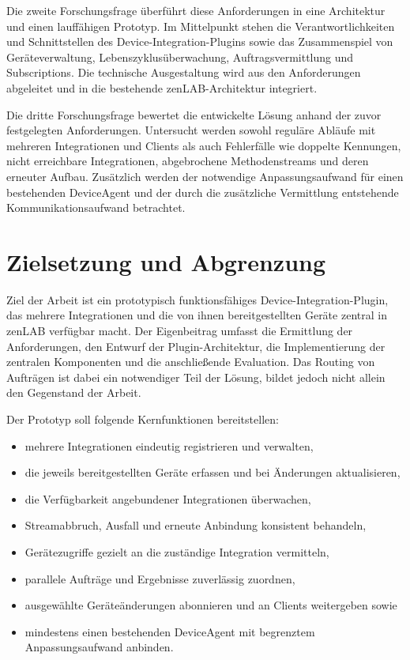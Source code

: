 Die zweite Forschungsfrage überführt diese Anforderungen in eine Architektur und einen lauffähigen Prototyp. Im Mittelpunkt stehen die Verantwortlichkeiten und Schnittstellen des Device-Integration-Plugins sowie das Zusammenspiel von Geräteverwaltung, Lebenszyklusüberwachung, Auftragsvermittlung und Subscriptions. Die technische Ausgestaltung wird aus den Anforderungen abgeleitet und in die bestehende zenLAB-Architektur integriert.

Die dritte Forschungsfrage bewertet die entwickelte Lösung anhand der zuvor festgelegten Anforderungen. Untersucht werden sowohl reguläre Abläufe mit mehreren Integrationen und Clients als auch Fehlerfälle wie doppelte Kennungen, nicht erreichbare Integrationen, abgebrochene Methodenstreams und deren erneuter Aufbau. Zusätzlich werden der notwendige Anpassungsaufwand für einen bestehenden DeviceAgent und der durch die zusätzliche Vermittlung entstehende Kommunikationsaufwand betrachtet.

\section{Zielsetzung und Abgrenzung}

Ziel der Arbeit ist ein prototypisch funktionsfähiges Device-Integration-Plugin, das mehrere Integrationen und die von ihnen bereitgestellten Geräte zentral in zenLAB verfügbar macht. Der Eigenbeitrag umfasst die Ermittlung der Anforderungen, den Entwurf der Plugin-Architektur, die Implementierung der zentralen Komponenten und die anschließende Evaluation. Das Routing von Aufträgen ist dabei ein notwendiger Teil der Lösung, bildet jedoch nicht allein den Gegenstand der Arbeit.

Der Prototyp soll folgende Kernfunktionen bereitstellen:

\begin{itemize}
\item mehrere Integrationen eindeutig registrieren und verwalten,
\item die jeweils bereitgestellten Geräte erfassen und bei Änderungen aktualisieren,
\item die Verfügbarkeit angebundener Integrationen überwachen,
\item Streamabbruch, Ausfall und erneute Anbindung konsistent behandeln,
\item Gerätezugriffe gezielt an die zuständige Integration vermitteln,
\item parallele Aufträge und Ergebnisse zuverlässig zuordnen,
\item ausgewählte Geräteänderungen abonnieren und an Clients weitergeben sowie
\item mindestens einen bestehenden DeviceAgent mit begrenztem Anpassungsaufwand anbinden.
\end{itemize}

